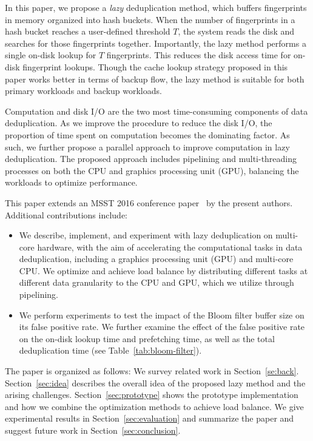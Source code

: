 \documentclass[prodmode,acmtecs]{acmsmall}
\begin{document}
In this paper, we propose a \emph{lazy} deduplication method, which buffers fingerprints in memory organized into hash buckets.  When the number of fingerprints in a hash bucket reaches a user-defined threshold $T$, the system reads the disk and searches for those fingerprints together. Importantly, the lazy method performs a single on-disk lookup for $T$ fingerprints. This reduces the disk access time for on-disk fingerprint lookups. Though the cache lookup strategy proposed in this paper works better in terms of backup flow, the lazy method is suitable for both primary workloads and backup workloads.

Computation and disk I/O are the two most time-consuming components of data deduplication. As we improve the procedure to reduce the disk I/O, the proportion of time spent on computation becomes the dominating factor.  As such, we further propose a parallel approach to improve computation in lazy deduplication.  The proposed approach includes pipelining and multi-threading processes on both the CPU and graphics processing unit (GPU), balancing the workloads to optimize performance.

This paper extends an MSST 2016 conference paper~\cite{ma2016lazy} by the present authors. Additional contributions include:

\begin{itemize}
\item We describe, implement, and experiment with lazy deduplication on multi-core hardware, with the aim of accelerating the computational tasks in data deduplication, including a graphics processing unit (GPU) and multi-core CPU.  We optimize and achieve load balance by distributing different tasks at different data granularity to the CPU and GPU, which we utilize through pipelining.
\item We perform experiments to test the impact of the Bloom filter buffer size on its false positive rate.  We further examine the effect of the false positive rate on the on-disk lookup time and prefetching time, as well as the total deduplication time (see Table~\ref{tab:bloom-filter}).

\end{itemize}

The paper is organized as follows: We survey related work in Section~\ref{se:back}.  Section~\ref{sec:idea} describes the overall idea of the proposed lazy method and the arising challenges. Section~\ref{sec:prototype} shows the prototype implementation and how we combine the optimization methods to achieve load balance. We give experimental results in Section~\ref{sec:evaluation} and summarize the paper and suggest future work in Section~\ref{sec:conclusion}.
\end{document}
